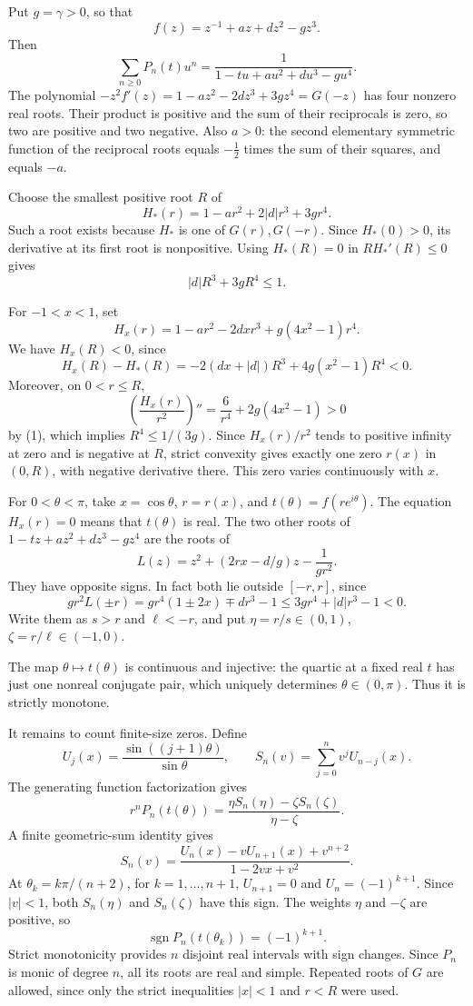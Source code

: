 \begin{proof*}
Put $g=\gamma>0$, so that
\[
 f(z)=z^{-1}+az+dz^2-gz^3.
\]
Then
\[
 \sum_{n\geq0}P_n(t)u^n
 =\frac1{1-tu+au^2+du^3-gu^4}.
\]
The polynomial $-z^2f'(z)=1-az^2-2dz^3+3gz^4=G(-z)$
has four nonzero real roots. Their product is positive and the sum of
their reciprocals is zero, so two are positive and two negative.
Also $a>0$: the second elementary symmetric function of the reciprocal
roots equals $-\frac12$ times the sum of their squares, and equals $-a$.

Choose the smallest positive root $R$ of
\[
 H_*(r)=1-ar^2+2|d|r^3+3gr^4.
\]
Such a root exists because $H_*$ is one of $G(r),G(-r)$.
Since $H_*(0)>0$, its derivative at its first root is nonpositive.
Using $H_*(R)=0$ in $RH_*'(R)\leq0$ gives
\[
 |d|R^3+3gR^4\leq1. \tag{1}
\]

For $-1<x<1$, set
\[
 H_x(r)=1-ar^2-2dxr^3+g(4x^2-1)r^4.
\]
We have $H_x(R)<0$, since
\[
 H_x(R)-H_*(R)=-2(dx+|d|)R^3+4g(x^2-1)R^4<0.
\]
Moreover, on $0<r\leq R$,
\[
 \left(\frac{H_x(r)}{r^2}\right)''
 =\frac6{r^4}+2g(4x^2-1)>0
\]
by (1), which implies $R^4\leq1/(3g)$.
Since $H_x(r)/r^2$ tends to positive infinity at zero and is negative
at $R$, strict convexity gives exactly one zero $r(x)$ in $(0,R)$,
with negative derivative there. This zero varies continuously with $x$.

For $0<\theta<\pi$, take $x=\cos\theta$, $r=r(x)$, and
$t(\theta)=f(re^{i\theta})$. The equation $H_x(r)=0$ means
that $t(\theta)$ is real. The two other roots of
$1-tz+az^2+dz^3-gz^4$ are the roots of
\[
 L(z)=z^2+(2rx-d/g)z-\frac1{gr^2}.
\]
They have opposite signs. In fact both lie outside $[-r,r]$, since
\[
 gr^2 L(\pm r)
 =gr^4(1\pm2x)\mp dr^3-1
 \leq3gr^4+|d|r^3-1<0.
\]
Write them as $s>r$ and $\ell<-r$, and put
$\eta=r/s\in(0,1)$, $\zeta=r/\ell\in(-1,0)$.

The map $\theta\mapsto t(\theta)$ is continuous and injective:
the quartic at a fixed real $t$ has just one nonreal conjugate pair,
which uniquely determines $\theta\in(0,\pi)$. Thus it is strictly monotone.

It remains to count finite-size zeros. Define
\[
 U_j(x)=\frac{\sin((j+1)\theta)}{\sin\theta},\qquad
 S_n(v)=\sum_{j=0}^n v^jU_{n-j}(x).
\]
The generating function factorization gives
\[
 r^nP_n(t(\theta))
 =\frac{\eta S_n(\eta)-\zeta S_n(\zeta)}{\eta-\zeta}.
\]
A finite geometric-sum identity gives
\[
 S_n(v)=\frac{U_n(x)-vU_{n+1}(x)+v^{n+2}}{1-2vx+v^2}.
\]
At $\theta_k=k\pi/(n+2)$, for $k=1,\dotsc,n+1$,
$U_{n+1}=0$ and $U_n=(-1)^{k+1}$. Since $|v|<1$,
both $S_n(\eta)$ and $S_n(\zeta)$ have this sign.
The weights $\eta$ and $-\zeta$ are positive, so
\[
 \operatorname{sgn}P_n(t(\theta_k))=(-1)^{k+1}.
\]
Strict monotonicity provides $n$ disjoint real intervals with sign changes.
Since $P_n$ is monic of degree $n$, all its roots are real and simple.
Repeated roots of $G$ are allowed, since only the strict inequalities
$|x|<1$ and $r<R$ were used.
\end{proof*}

